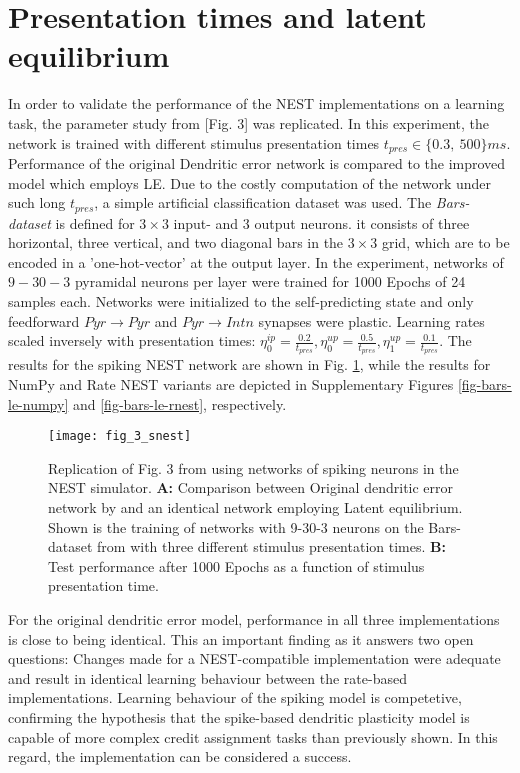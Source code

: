 \section{Presentation times and latent equilibrium}\label{sec-le-tpres}

In order to validate the performance of the NEST implementations on a learning task, the parameter study from
\citep{Haider2021}[Fig. 3] was replicated. In this experiment, the network is trained with different stimulus
presentation times $t_{pres} \in \{0.3,\ 500\}ms$. Performance of the original Dendritic error network is compared to
the improved model which employs LE. Due to the costly computation of the network under such long $t_{pres}$, a simple
artificial classification dataset was used. The \textit{Bars-dataset} is defined for $3\times3$ input- and $3$ output
neurons. it consists of three horizontal, three vertical, and two diagonal bars in the $3\times3$ grid, which are to be
encoded in a 'one-hot-vector' at the output layer. In the experiment, networks of $9-30-3$ pyramidal neurons per layer
were trained for 1000 Epochs of 24 samples each. Networks were initialized to the self-predicting state and only
feedforward $Pyr\rightarrow Pyr$ and $Pyr \rightarrow Intn$ synapses were plastic. Learning rates scaled inversely with
presentation times: $\eta^{ip}_0 = \frac{0.2}{t_{pres}}, \eta^{up}_0 = \frac{0.5}{t_{pres}}, \eta^{up}_1 =
    \frac{0.1}{t_{pres}}$. The results for the spiking NEST network are shown in Fig. \ref{fig-bars-le-snest}, while the
results for NumPy and Rate NEST variants are depicted in Supplementary Figures \ref{fig-bars-le-numpy} and
\ref{fig-bars-le-rnest}, respectively.


\begin{figure}[h]
    \centering
    \texttt{[image: fig\_3\_snest]}
    \caption[Replication of Fig. 3 from \citep{Haider2021}]{Replication of Fig. 3 from \citep{Haider2021} using networks
        of spiking neurons in the NEST simulator. \textbf{A:} Comparison between Original dendritic error network by and
        an identical network employing Latent equilibrium. Shown is the training of networks with 9-30-3 neurons on the
        Bars-dataset from with three different stimulus presentation times. \textbf{B:} Test performance after 1000
        Epochs as a function of stimulus presentation time.}
    \label{fig-bars-le-snest}
\end{figure}

For the original dendritic error model, performance in all three implementations is close to being identical. This an
important finding as it answers two open questions: Changes made for a NEST-compatible implementation were adequate and
result in identical learning behaviour between the rate-based implementations. Learning behaviour of the spiking model
is competetive, confirming the hypothesis that the spike-based dendritic plasticity model is capable of more complex
credit assignment tasks than previously shown. In this regard, the implementation can be considered a success.

